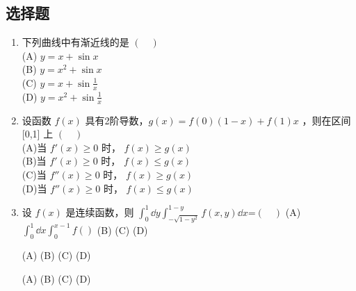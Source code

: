
\subsection{选择题}
\begin{enumerate}
\item 下列曲线中有渐近线的是 $(\quad)$\\
(A) $y=x+\sin x$\\
(B) $y=x^2+\sin x$\\
(C) $y=x+\sin \frac{1}{x}$\\
(D) $y=x^2+\sin \frac{1}{x}$
\item  设函数 $f(x)$ 具有2阶导数，$g(x)=f(0)(1-x)+f(1)x$  ，则在区间  [0,1] 上 $(\quad)$\\
(A)当 $f'(x) \ge 0$ 时， $f(x)\ge g(x)$\\
(B)当 $f'(x) \ge 0$ 时， $f(x)\le g(x)$\\
(C)当 $f''(x) \ge 0$ 时， $f(x)\ge g(x)$\\
(D)当 $f''(x) \ge 0$ 时， $f(x)\le g(x)$
\item 设 $f(x)$ 是连续函数，则 $\int_0^1 \dd{y}\int_{-\sqrt{1-y^2}}^{1-y}f(x,y)\dd{x}$=$(\quad)$
(A) $\int_0^1\dd{x}\int_0^{x-1}f()$
(B)
(C)
(D)


(A)
(B)
(C)
(D)


(A)
(B)
(C)
(D)
\end{enumerate}